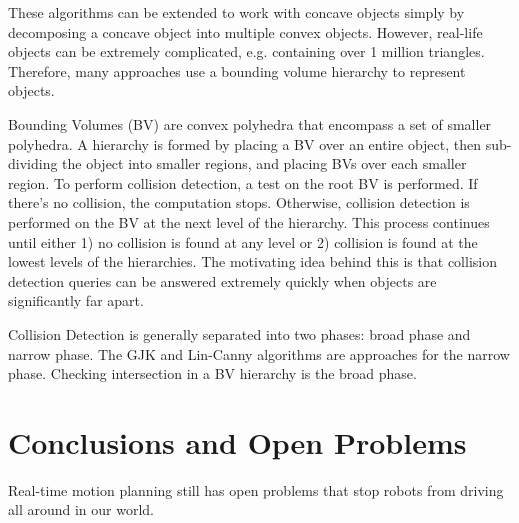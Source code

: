 \documentclass[10pt,conference]{ieeeconf}
\begin{document}
	These algorithms can be extended to work with concave objects simply by decomposing a concave object into multiple convex objects. However, real-life objects can be extremely complicated, e.g. containing over 1 million triangles. Therefore, many approaches use a bounding volume hierarchy to represent objects.
	
	Bounding Volumes (BV) are convex polyhedra	that encompass a set of smaller polyhedra. A hierarchy is formed by placing a BV over an entire object, then sub-dividing the object into smaller regions, and placing BVs over each smaller region. To perform collision detection, a test on the root BV is performed. If there's no collision, the computation stops. Otherwise, collision detection is performed on the BV at the next level of the hierarchy. This process continues until either 1) no collision is found at any level or 2) collision is found at the lowest levels of the hierarchies. The motivating idea behind this is that collision detection queries can be answered extremely quickly when objects are significantly far apart. 
	
	Collision Detection is generally separated into two phases: broad phase and narrow phase. The GJK and Lin-Canny algorithms are approaches for the narrow phase. Checking intersection in a BV hierarchy is the broad phase.



\section{Conclusions and Open Problems}
    
    Real-time motion planning still has open problems that stop robots from driving all around in our world.




\end{document}
